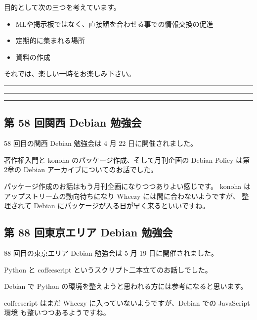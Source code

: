 \documentclass[mingoth,a4paper]{jsarticle}
\begin{document}
 目的として次の三つを考えています。
 \begin{itemize}
  \item MLや掲示板ではなく、直接顔を合わせる事での情報交換の促進
  \item 定期的に集まれる場所
  \item 資料の作成
 \end{itemize}

 それでは、楽しい一時をお楽しみ下さい。

\newpage

\begin{minipage}[b]{0.2\hsize}
 {}
\end{minipage}
\begin{minipage}[b]{0.8\hsize}
\hrule
\vspace{2mm}
\hrule
\setcounter{tocdepth}{1}
\tableofcontents
\vspace{2mm}
\hrule
\end{minipage}


\subsection{第 58 回関西 Debian 勉強会}
58 回目の関西 Debian 勉強会は 4 月 22 日に開催されました。

著作権入門と konoha のパッケージ作成、そして月刊企画の Debian Policy は第2章の
Debian アーカイブについてのお話でした。

パッケージ作成のお話はもう月刊企画になりつつありよい感じです。
konoha はアップストリームの動向待ちになり Wheezy には間に合わないようですが、
整理されて Debian にパッケージが入る日が早く来るといいですね。


\subsection{第 88 回東京エリア Debian 勉強会}
88 回目の東京エリア Debian 勉強会は 5 月 19 日に開催されました。

Python と coffeescript というスクリプト二本立てのお話しでした。

Debian で Python の環境を整えようと思われる方には参考になると思います。

coffeescript はまだ Wheezy に入っていないようですが、Debian での JavaScript 環境
も整いつつあるようですね。

\clearpage
\end{document}
